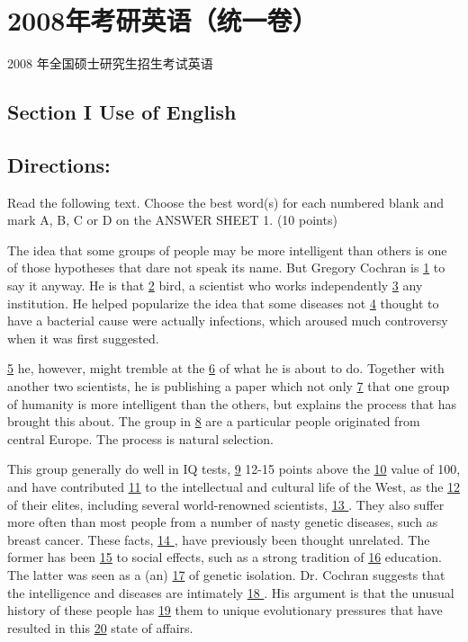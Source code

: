 \documentclass[UTF8,11pt]{ctexart}
\begin{document}
\section*{2008年考研英语（统一卷）}
2008 年全国硕士研究生招生考试英语


\subsection*{\textbf{Section I Use of English}}


\subsection*{\textbf{Directions:}}


Read the following text. Choose the best word(s) for each numbered blank and mark A, B, C or D on the ANSWER SHEET 1. (10 points)


The idea that some groups of people may be more intelligent than others is one of those hypotheses that dare not speak its name. But Gregory Cochran is \uline{1} to say it anyway. He is that \uline{2} bird, a scientist who works independently \uline{3} any institution. He helped popularize the idea that some diseases not \uline{4} thought to have a bacterial cause were actually infections, which aroused much controversy when it was first suggested.


\uline{5} he, however, might tremble at the \uline{6} of what he is about to do. Together with another two scientists, he is publishing a paper which not only \uline{7} that one group of humanity is more intelligent than the others, but explains the process that has brought this about. The group in \uline{8} are a particular people originated from central Europe. The process is natural selection.


This group generally do well in IQ tests, \uline{9} 12-15 points above the \uline{10} value of 100, and have contributed \uline{11} to the intellectual and cultural life of the West, as the \uline{12} of their elites, including several world-renowned scientists, \uline{13 }. They also suffer more often than most people from a number of nasty genetic diseases, such as breast cancer. These facts, \uline{14 }, have previously been thought unrelated. The former has been \uline{15} to social effects, such as a strong tradition of \uline{16} education. The latter was seen as a (an) \uline{17} of genetic isolation. Dr. Cochran suggests that the intelligence and diseases are intimately \uline{18 }. His argument is that the unusual history of these people has \uline{19} them to unique evolutionary pressures that have resulted in this \uline{20} state of affairs.
\end{document}
